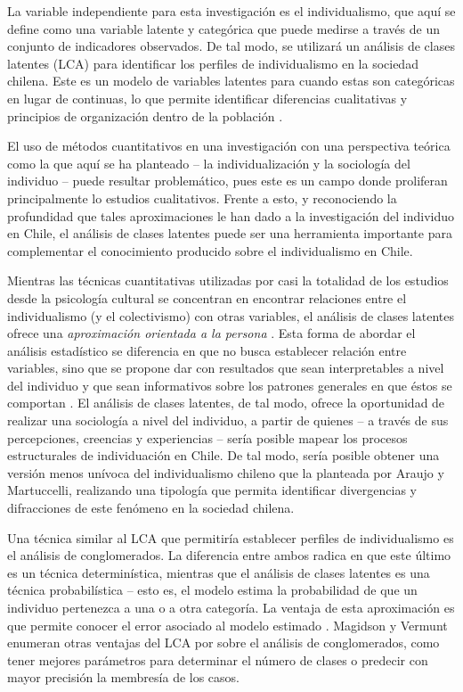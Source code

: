 \documentclass[12pt,twoside]{templates/facsothesis}
\begin{document}
La variable independiente para esta investigación es el individualismo, que aquí se define como una variable latente y categórica que puede medirse a través de un conjunto de indicadores observados. De tal modo, se utilizará un análisis de clases latentes (LCA) para identificar los perfiles de individualismo en la sociedad chilena. Este es un modelo de variables latentes para cuando estas son categóricas en lugar de continuas, lo que permite identificar diferencias cualitativas y principios de organización dentro de la población \citep{collins2010}.

El uso de métodos cuantitativos en una investigación con una perspectiva teórica como la que aquí se ha planteado -- la individualización y la sociología del individuo -- puede resultar problemático, pues este es un campo donde proliferan principalmente lo estudios cualitativos. Frente a esto, y reconociendo la profundidad que tales aproximaciones le han dado a la investigación del individuo en Chile, el análisis de clases latentes puede ser una herramienta importante para complementar el conocimiento producido sobre el individualismo en Chile.

Mientras las técnicas cuantitativas utilizadas por casi la totalidad de los estudios desde la psicología cultural se concentran en encontrar relaciones entre el individualismo (y el colectivismo) con otras variables, el análisis de clases latentes ofrece una \emph{aproximación orientada a la persona} \citep{collins2010}. Esta forma de abordar el análisis estadístico se diferencia en que no busca establecer relación entre variables, sino que se propone dar con resultados que sean interpretables a nivel del individuo y que sean informativos sobre los patrones generales en que éstos se comportan \citep{bergman2015}. El análisis de clases latentes, de tal modo, ofrece la oportunidad de realizar una sociología a nivel del individuo, a partir de quienes -- a través de sus percepciones, creencias y experiencias -- sería posible mapear los procesos estructurales de individuación en Chile. De tal modo, sería posible obtener una versión menos unívoca del individualismo chileno que la planteada por Araujo y Martuccelli, realizando una tipología que permita identificar divergencias y difracciones de este fenómeno en la sociedad chilena.

Una técnica similar al LCA que permitiría establecer perfiles de individualismo es el análisis de conglomerados. La diferencia entre ambos radica en que este último es un técnica determinística, mientras que el análisis de clases latentes es una técnica probabilística -- esto es, el modelo estima la probabilidad de que un individuo pertenezca a una o a otra categoría. La ventaja de esta aproximación es que permite conocer el error asociado al modelo estimado \citep{magidson2002}. Magidson y Vermunt \citeyearpar{magidson2002} enumeran otras ventajas del LCA por sobre el análisis de conglomerados, como tener mejores parámetros para determinar el número de clases o predecir con mayor precisión la membresía de los casos.
\end{document}
